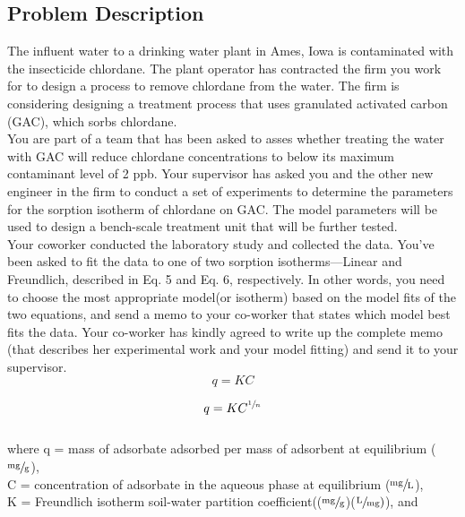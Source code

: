 \documentclass[12pt,letterpaper]{article}
\begin{document}
\subsection *{Problem Description}
The influent water to a drinking water plant in Ames, Iowa is contaminated with the insecticide chlordane. The plant operator has contracted the firm you work for to design a  process to remove chlordane from the water. The firm is considering designing a treatment process that uses granulated activated carbon (GAC), which sorbs chlordane.\\

You are part of a team that has been asked to asses whether treating the water with GAC will reduce chlordane concentrations to below its maximum contaminant level of 2 ppb. Your supervisor has asked you and the other new engineer in the firm to conduct a set of experiments to determine the parameters for the sorption isotherm of chlordane on GAC.  The model  parameters will be used to design a bench-scale treatment unit that will be further tested.\\

Your coworker conducted the laboratory study and collected the data. You've been asked to fit the data to one of two sorption isotherms---Linear and Freundlich, described in Eq. 5 and Eq. 6, respectively.  In other words, you need to choose the most appropriate model(or isotherm) based on the model fits of the two equations,  and send a memo to your co-worker that states which model best fits the data.  Your co-worker has kindly agreed to write up the complete memo (that describes her experimental work and your model fitting) and send it to your supervisor.\\

\begin{equation}
q = KC
\end{equation}


\begin{equation}
q = KC^{\sfrac{1}{n}}
\end{equation}\\

where q = mass of adsorbate adsorbed per mass of adsorbent at equilibrium ($\mathrm{\sfrac{mg}{g}}$),\\

C = concentration of adsorbate in the aqueous phase at equilibrium ($\mathrm{\sfrac{mg}{L}}$),\\

K = Freundlich isotherm soil-water partition coefficient(($\mathrm{\sfrac{mg}{g}}$)($\mathrm{\sfrac{L}{mg})}$), and\\
\end{document}

